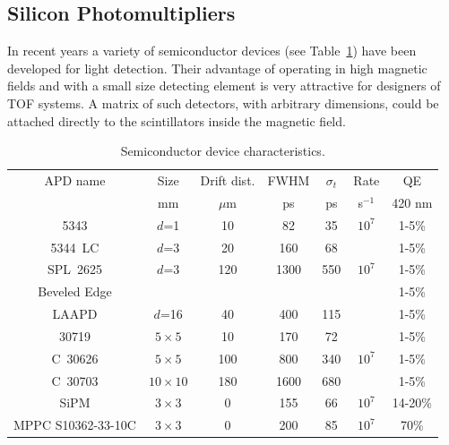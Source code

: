 \subsection{Silicon Photomultipliers}

In recent years a variety of semiconductor devices (see Table~\ref{apd}) have 
been developed for light detection.  Their advantage of operating in high 
magnetic fields and with a small size detecting element is very attractive for 
designers of TOF systems.  A matrix of such detectors, with arbitrary dimensions, 
could be attached directly to the scintillators inside the magnetic field.  

\begin{table}[htbp]
\begin{center}
\begin{tabular}{|c|c|c|c|c|c|c|} \hline
APD name      & Size         & Drift dist.   & FWHM & $\sigma_t$ & Rate & QE \\ 
              &   mm         & $\mu$m & ps   & ps       &    s$^{-1}$       & 420 nm \\ \hline
5343          & $d$=1        & 10     & 82   & 35  & $10^7$ & 1-5\%  \\ \hline
5344~LC       & $d$=3        & 20     & 160  & 68  &        & 1-5\%  \\ \hline
SPL~2625      & $d$=3        & 120    & 1300 & 550 & $10^7$ & 1-5\%  \\ \hline
Beveled Edge  &              &        &      &     &        & 1-5\%  \\
LAAPD         & $d$=16       & 40     & 400  & 115 &        & 1-5\%  \\ \hline
30719         & $5\times5$   & 10     & 170  & 72  &        & 1-5\%  \\ \hline
C~30626       & $5\times5$   & 100    & 800  & 340 &$10^7$  & 1-5\%  \\ \hline
C~30703       & $10\times10$ & 180    & 1600 & 680 &        & 1-5\%  \\ \hline
SiPM          & $3\times3$   & 0      & 155  & 66  &$10^7$  &14-20\% \\ \hline
MPPC S10362-33-10C& $3\times3$   & 0  & 200  & 85  &$10^7$  &70\% \\ \hline
\end{tabular}
\caption{\small{Semiconductor device characteristics.}}
\label{apd}
\end{center}
\end{table}

